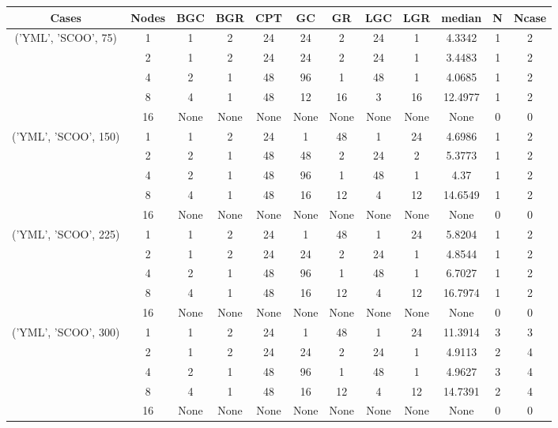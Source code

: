 \begin{tabular}{cccccccccccc}
\hline
Cases & Nodes& BGC& BGR& CPT& GC& GR& LGC& LGR& median & N & Ncase \\
\hline
\multirow{5}{*}{('YML', 'SCOO', 75)}& 1& 1& 2& 24& 24& 2& 24& 1& 4.3342& 1& 2\\
& 2& 1& 2& 24& 24& 2& 24& 1& 3.4483& 1& 2\\
& 4& 2& 1& 48& 96& 1& 48& 1& 4.0685& 1& 2\\
& 8& 4& 1& 48& 12& 16& 3& 16& 12.4977& 1& 2\\
& 16& None& None& None& None& None& None& None& None& 0& 0\\
\hline
\multirow{5}{*}{('YML', 'SCOO', 150)}& 1& 1& 2& 24& 1& 48& 1& 24& 4.6986& 1& 2\\
& 2& 2& 1& 48& 48& 2& 24& 2& 5.3773& 1& 2\\
& 4& 2& 1& 48& 96& 1& 48& 1& 4.37& 1& 2\\
& 8& 4& 1& 48& 16& 12& 4& 12& 14.6549& 1& 2\\
& 16& None& None& None& None& None& None& None& None& 0& 0\\
\hline
\multirow{5}{*}{('YML', 'SCOO', 225)}& 1& 1& 2& 24& 1& 48& 1& 24& 5.8204& 1& 2\\
& 2& 1& 2& 24& 24& 2& 24& 1& 4.8544& 1& 2\\
& 4& 2& 1& 48& 96& 1& 48& 1& 6.7027& 1& 2\\
& 8& 4& 1& 48& 16& 12& 4& 12& 16.7974& 1& 2\\
& 16& None& None& None& None& None& None& None& None& 0& 0\\
\hline
\multirow{5}{*}{('YML', 'SCOO', 300)}& 1& 1& 2& 24& 1& 48& 1& 24& 11.3914& 3& 3\\
& 2& 1& 2& 24& 24& 2& 24& 1& 4.9113& 2& 4\\
& 4& 2& 1& 48& 96& 1& 48& 1& 4.9627& 3& 4\\
& 8& 4& 1& 48& 16& 12& 4& 12& 14.7391& 2& 4\\
& 16& None& None& None& None& None& None& None& None& 0& 0\\
\hline
\end{tabular}



